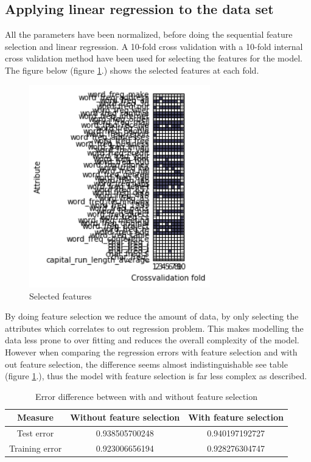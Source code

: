 \subsection{Applying linear regression to the data set}
All the parameters have been normalized, before doing the sequential feature selection and linear regression. A 10-fold cross validation with a 10-fold internal cross validation method have been used for selecting the features for the model. The figure below (figure \ref{fig:selected_features}.) shows the selected features at each fold. 

\vspace{-5pt}
\begin{figure}[!ht]
	\centering
	\includegraphics[width=0.7\textwidth]{Fig/regression_1.png}
	\vspace{-5pt}
	\caption{Selected features}
	\label{fig:selected_features}
\end{figure}

By doing feature selection we reduce the amount of data, by only selecting the attributes which correlates to out regression problem. This makes modelling the data less prone to over fitting and reduces the overall complexity of the model. However when comparing the regression errors with feature selection and with out feature selection, the difference seems almost indistinguishable see table (figure \ref{tab:feature_selection_vs_no}.), thus the model with feature selection is far less complex as described.

\begin{table}[!ht]
  	\centering
  		\begin{tabular}{ccc}
  			\hline
  			 Measure & Without feature selection & With feature selection\\ \hline \hline
  			Test error & 0.938505700248 & 0.940197192727 \\
  			Training error & 0.923006656194 & 0.928276304747 \\ \hline
  		\end{tabular}
	\caption{Error difference between with and without feature selection}
  	\label{tab:feature_selection_vs_no}
\end{table}

